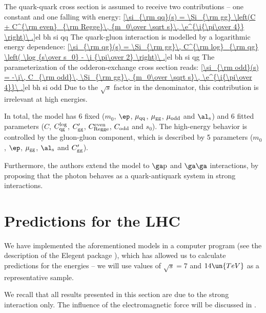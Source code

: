 The quark-quark cross section is assumed to receive two contributions -- one constant and one falling with energy:
\eqref{\si_{\rm qq}(s) = \Si_{\rm gg} \left(C + C^{\rm even}_{\rm Regge}\, {m_0\over \sqrt s}\, \e^{\i{\pi\over 4}} \right)\ .}{el bh si qq}
The quark-gluon interaction is modelled by a logarithmic energy dependence:
\eqref{\si_{\rm qg}(s) = \Si_{\rm gg}\, C^{\rm log}_{\rm qg} \left( \log {s\over s_0} - \i {\pi\over 2} \right)\ .}{el bh si qg}
The parameterization of the odderon-exchange cross section reads:
\eqref{\si_{\rm odd}(s) = -\i\, C_{\rm odd}\, \Si_{\rm gg}\, {m_0\over \sqrt s}\,  \e^{\i{\pi\over 4}}\ .}{el bh si odd}
Due to the $\sqrt s$ factor in the denominator, this contribution is irrelevant at high energies.

In total, the model has 6 fixed ($m_0$, $\ep$, $\mu_{\rm qq}$, $\mu_{\rm gg}$, $\mu_{\rm odd}$ and $\al_{\rm s}$) and 6 fitted parameters ($C$, $C^{\rm log}_{\rm qg}$, $C'_{\rm gg}$, $C^{\rm even}_{\rm Regge}$, $C_{\rm odd}$ and $s_0$). The high-energy behavior is controlled by the gluon-gluon component, which is described by 5 parameters ($m_0$, $\ep$, $\mu_{\rm gg}$, $\al_{\rm s}$ and $C'_{\rm gg}$).

Furthermore, the authors extend the model to $\rm\ga p$ and $\rm\ga\ga$ interactions, by proposing that the photon behaves as a quark-antiquark system in strong interactions.




\section[el pred]{Predictions for the LHC}

We have implemented the aforementioned models in a computer program (see the description of the Elegent package ), which has allowed us to calculate predictions for the  energies -- we will use values of $\sqrt s = 7$ and $14\un{TeV}$ as a representative sample.

We recall that all results presented in this section are due to the strong interaction only. The influence of the electromagnetic force will be discussed in .

